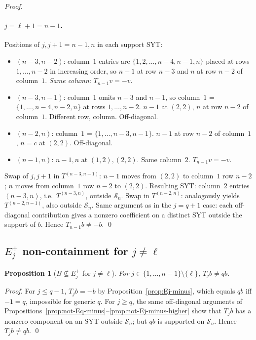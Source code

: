 \documentclass[11pt]{article}
\newtheorem{proposition}[theorem]{Proposition}
\theoremstyle{definition}
\begin{document}
\begin{proof}
\paragraph{$j = \ell+1 = n - 1$.}  Positions of $j, j+1 = n-1, n$ in
each support SYT:
\begin{itemize}[topsep=0.3em,itemsep=0.1em]
\item $(n-3, n-2)$: column~$1$ entries are $\{1,2,\ldots,n-4,n-1,n\}$
  placed at rows $1,\ldots,n-2$ in increasing order, so $n-1$ at row
  $n-3$ and $n$ at row $n-2$ of column~$1$.  \emph{Same column}:
  $T_{n-1}v = -v$.
\item $(n-3, n-1)$: column~$1$ omits $n-3$ and $n-1$, so column~$1$ =
  $\{1,\ldots,n-4,n-2,n\}$ at rows $1,\ldots,n-2$.  $n-1$ at $(2,2)$,
  $n$ at row $n-2$ of column~$1$.  Different row, column.
  Off-diagonal.
\item $(n-2, n)$: column~$1$ = $\{1,\ldots,n-3,n-1\}$.  $n-1$ at row
  $n-2$ of column~$1$, $n = c$ at $(2,2)$.  Off-diagonal.
\item $(n-1, n)$: $n-1, n$ at $(1,2), (2,2)$.  Same column~$2$.
  $T_{n-1} v = -v$.
\end{itemize}
Swap of $j, j+1$ in $T^{(n-3, n-1)}$: $n-1$ moves from $(2, 2)$ to
column~$1$ row $n-2$; $n$ moves from column~$1$ row $n-2$ to $(2, 2)$.
Resulting SYT: column~$2$ entries $(n-3, n)$, i.e.\ $T^{(n-3, n)}$,
outside $\mathcal{S}_n$.
Swap in $T^{(n-2, n)}$: analogously yields $T^{(n-2, n-1)}$, also
outside $\mathcal{S}_n$.  Same argument as in the $j = q+1$ case:
each off-diagonal contribution gives a nonzero coefficient on a
distinct SYT outside the support of $b$.  Hence $T_{n-1} b \ne -b$.
\qed
\end{proof}

\subsection{$E_j^+$ non-containment for $j \ne \ell$}

\begin{proposition}[$B \not\subseteq E_j^+$ for $j \ne \ell$]\label{prop:not-Ej-plus}
For $j \in \{1, \ldots, n-1\} \setminus \{\ell\}$, $T_j b \ne q b$.
\end{proposition}

\begin{proof}
For $j \le q - 1$, $T_j b = -b$ by Proposition~\ref{prop:Ej-minus},
which equals $qb$ iff $-1 = q$, impossible for generic $q$.  For
$j \ge q$, the same off-diagonal arguments of
Propositions~\ref{prop:not-Eq-minus}--\ref{prop:not-Ej-minus-higher}
show that $T_j b$ has a nonzero component on an SYT outside
$\mathcal{S}_n$; but $qb$ is supported on $\mathcal{S}_n$.
Hence $T_j b \ne qb$.
\qed
\end{proof}
\end{document}
